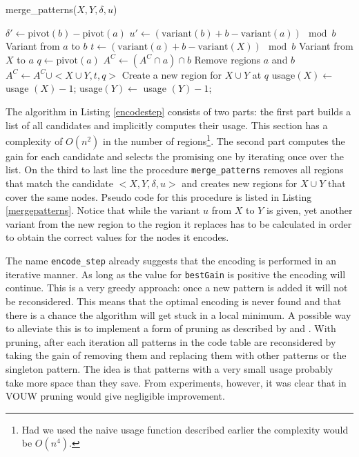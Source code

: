 \documentclass{llncs}
\begin{document}
\begin{algorithm}
\caption{merge\_patterns($X,Y,\delta,u$)}
\label{mergepatterns}
\begin{algorithmic}
		\State $\delta' \gets \mathrm{pivot}(b) - \mathrm{pivot}(a)$
		\State $u' \gets (\mathrm{variant}(b) + b - \mathrm{variant}(a)) \mod b$
			\Comment Variant from $a$ to $b$
			\State $t \gets (\mathrm{variant}(a) + b - \mathrm{variant}(X)) \mod b$
					\Comment Variant from $X$ to $a$
			\State $q \gets \mathrm{pivot}(a)$
			\State $A^C \gets (A^C \cap a ) \cap b$
				\Comment Remove regions $a$ and $b$
			\State $A^C \gets A^C \cup <X\cup Y,t,q>$
				\Comment Create a new region for $X\cup Y$ at $q$
			\State usage$(X) \gets$ usage $(X)-1$; usage$(Y) \gets$ usage $(Y)-1$;
		\EndIf
	\EndFor
\EndFor
\end{algorithmic}
\end{algorithm} 

The algorithm in Listing \ref{encodestep} consists of two parts: the first part builds a list of all candidates and implicitly computes their usage. This section has a complexity of $O(n^2)$ in the number of regions\footnote{Had we used the naive usage function described earlier the complexity would be $O(n^4)$.}. The second part computes the gain for each candidate and selects the promising one by iterating once over the list. On the third to last line the procedure \texttt{merge\_patterns} removes all regions that match the candidate $<X,Y,\delta,u>$ and creates new regions for $X\cup Y$ that cover the same nodes. Pseudo code for this procedure is listed in Listing \ref{mergepatterns}. Notice that while the variant $u$ from $X$ to $Y$ is given, yet another variant from the new region to the region it replaces has to be calculated in order to obtain the correct values for the nodes it encodes.

The name \texttt{encode\_step} already suggests that the encoding is performed in an iterative manner. As long as the value for \texttt{bestGain} is positive the encoding will continue. This is a very greedy approach: once a new pattern is added it will not be reconsidered. This means that the optimal encoding is never found and that there is a chance the algorithm will get stuck in a local minimum. A possible way to alleviate this is to implement a form of pruning as described by \cite{krimp} and \cite{slim}. With pruning, after each iteration all patterns in the code table are reconsidered by taking the gain of removing them and replacing them with other patterns or the singleton pattern. The idea is that patterns with a very small usage probably take more space than they save. From experiments, however, it was clear that in VOUW pruning would give negligible improvement.
\end{document}
